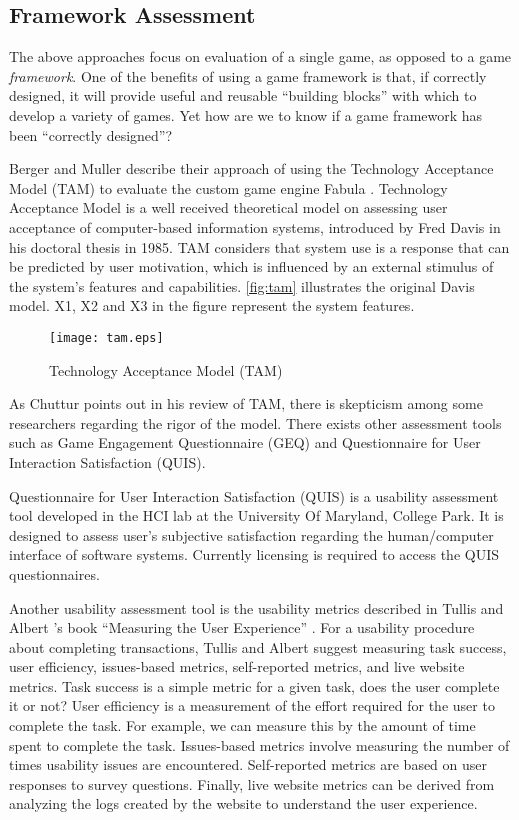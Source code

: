 \subsection{Framework Assessment}

The above approaches focus on evaluation of a single game, as opposed to a game {\em
  framework}. One of the benefits of using a game framework is that, if correctly designed, it will provide useful and reusable ``building blocks'' with which to develop a variety of games. Yet how are we to know if a game framework has been ``correctly designed''?

Berger and Muller \cite {fabulaengine} describe their approach of using the Technology Acceptance Model (TAM) to evaluate the custom game engine Fabula \cite{fabula}. Technology Acceptance Model \cite {davis1986technology} is a well received theoretical model on assessing user acceptance of computer-based information systems, introduced by Fred Davis in his doctoral thesis in 1985. TAM considers that system use is a response that can be predicted by user motivation, which is influenced by an external stimulus of the system's features and capabilities. \autoref{fig:tam} illustrates the original Davis model. X1, X2 and X3 in the figure represent the system features.

\begin{figure}[ht!]
	\centering
		\texttt{[image: tam.eps]}
		\caption{Technology Acceptance Model (TAM) \cite{davis1986technology}}
		\label{fig:tam}
\end{figure}

As Chuttur \cite{chuttur2009overview} points out in his review of TAM, there is  skepticism among some researchers regarding the rigor of the model. There exists  other assessment tools such as Game Engagement Questionnaire (GEQ) and Questionnaire for User Interaction Satisfaction (QUIS).  

Questionnaire for User Interaction Satisfaction (QUIS) \cite{harper1993improving} is a usability assessment tool developed in the HCI lab at the University Of Maryland, College Park. It is designed to assess user's subjective satisfaction regarding the human/computer interface of software systems. Currently licensing is required to access the QUIS questionnaires. 

Another usability assessment tool is the usability metrics described in Tullis and Albert 's book ``Measuring the User Experience'' \cite{tullis2010measuring}. For a usability procedure about completing transactions, Tullis and Albert suggest measuring task success, user efficiency, issues-based metrics, self-reported metrics, and live website metrics. Task success is a simple metric for a given task, does the user complete it or not? User efficiency is a measurement
of the effort required for the user to complete the task. For example, we can measure this by the amount of time spent to complete the task. Issues-based metrics involve measuring the number of times usability issues are encountered. Self-reported metrics are based on user responses to survey questions. Finally, live website metrics can be derived from analyzing the logs created by the website to understand the user experience.

